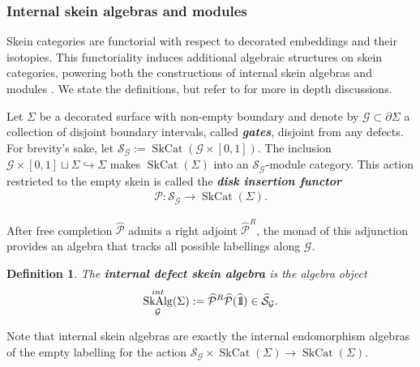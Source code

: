 \documentclass[a4paper]{article}
\numberwithin{equation}{section}
\newtheorem{definition}[counter]{Definition}
\newcommand{\1}{{\mathrm{1}\mkern-4mu{\mathchoice{}{}{\mskip-0.5mu}{\mskip-1mu}}\mathrm{l}}}
\newcommand{\G}{\mathcal{G}}
\renewcommand{\P}{\mathcal{P}}
\DeclareMathOperator{\SkCat}{SkCat}
\DeclareMathOperator{\SkAlg}{SkAlg}
\begin{document}
\subsubsection{Internal skein algebras and modules}\label{sec:internal-skein-constructions}

Skein categories are functorial with respect to decorated embeddings and their isotopies.
This functoriality induces additional algebraic structures on skein categories, powering both the constructions of internal skein algebras and modules \cite{BBJ2018Integrating}.
We state the definitions, but refer to \cite{BBJ2018Integrating,GJS2023,Brown_Jordan_2025} for more in depth discussions. 

Let $\Sigma$ be a decorated surface with non-empty boundary and denote by $\G \subset \partial \Sigma$ a collection of disjoint boundary intervals, called \emph{\bf gates}, disjoint from any defects. For brevity's sake, let $\mathcal{S}_\G := \SkCat(\G\times [0,1])$.
The inclusion $\G \times [0,1] \sqcup \Sigma \hookrightarrow \Sigma$ makes $\SkCat(\Sigma)$ into an $\mathcal{S}_\G$-module category. This action restricted to the empty skein is called the \emph{\bf disk insertion functor}
\begin{align}
    \P : \mathcal{S}_\G \to \SkCat(\Sigma).
\end{align}

After free completion $\widehat{\P}$ admits a right adjoint $\widehat{\P}^R$, the monad of this adjunction provides an algebra that tracks all possible labellings along $\G$.
\begin{definition}
    The \emph{\bf{internal defect skein algebra}} is the algebra object 
    \begin{align}
      \SkAlg^{int}_\G(\Sigma) := \widehat{\P}^R\widehat{\P}(\widehat{\1}) \in \widehat{\mathcal{S}}_\G.
    \end{align}
\end{definition}
Note that internal skein algebras are exactly the internal endomorphism algebras of the empty labelling for the action $\mathcal{S}_\G \times \SkCat(\Sigma) \to \SkCat(\Sigma)$.
\end{document}
